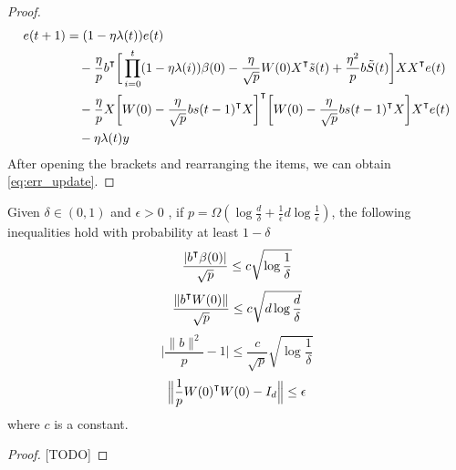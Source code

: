 \begin{proof}
\begin{equation*}
\begin{aligned}
    e(t+1) &= (1-\eta\lambda(t))e(t) \\
    &\quad-\frac{\eta}{p}b\transpose\bigg[ \prod_{i=0}^{t}(1-\eta\lambda(i))\beta(0) -\frac{\eta}{\sqrt p}W(0)X\transpose \tilde{s}(t) +\frac{\eta^2}{p}b \tilde{S}(t)\bigg]XX\transpose e(t) \\
    &\quad - \frac{\eta}{p}X\bigg[W(0) -\frac{\eta}{\sqrt p}bs(t-1)\transpose X\bigg]\transpose \bigg[W(0) -\frac{\eta}{\sqrt p}bs(t-1)\transpose X\bigg]X\transpose e(t)\\
    &\quad - \eta\lambda(t)y
\end{aligned}
\end{equation*} 
After opening the brackets and rearranging the items, we can obtain \eqref{eq:err_update}.
\end{proof}

\begin{lemma}
\label{lma:ineqs_2}
Given $\delta\in(0,1)$ and $\epsilon>0$ , if $p=\Omega(\log\frac{d}{\delta}+\frac{1}{\epsilon}d\log\frac{1}{\epsilon})$, the following inequalities hold with probability at least $1-\delta$
\begin{equation}
\label{eq:bbeta_sqrtp}
\frac{|b\transpose\beta(0)|}{\sqrt p}\leq c\sqrt{\log\frac{1}{\delta}}
\end{equation}
\begin{equation}
\label{eq:bW_sqrtp}
\frac{\|b\transpose W(0)\|}{\sqrt p}\leq c\sqrt{d\log\frac{d}{\delta}}
\end{equation}
\begin{equation}
\label{eq:b_norm}
\Big|\frac{\|b\|^2}{p}-1\Big| \leq  \frac{c}{\sqrt p}\sqrt {\log \frac{1}{\delta}}
\end{equation}
\begin{equation}
\label{eq:ww_p}
\Big\|\frac{1}{p}W(0)\transpose W(0) - I_d \Big\|\leq \epsilon
\end{equation}
where $c$ is a constant.
\end{lemma}

\begin{proof}[Proof]
[TODO]
\end{proof}


